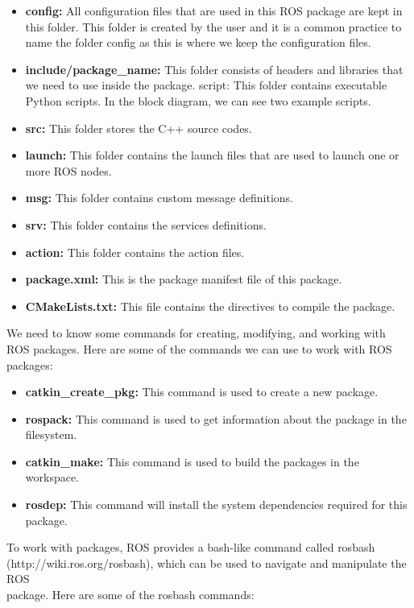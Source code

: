 \documentclass[../../main]{subfiles}
\begin{document}
\begin{itemize}
    \item \textbf{config:} All configuration files that are used in this ROS package are kept in this
    folder. This folder is created by the user and it is a common practice to name the
    folder config as this is where we keep the configuration files.
    \item \textbf{include/package\_name:} This folder consists of headers and libraries that we
    need to use inside the package.
    script: This folder contains executable Python scripts. In the block diagram, we
can see two example scripts.
\item \textbf{src:} This folder stores the C++ source codes.
\item \textbf{launch:} This folder contains the launch files that are used to launch one or more
ROS nodes.
\item \textbf{msg:} This folder contains custom message definitions.
\item \textbf{srv:} This folder contains the services definitions.
\item \textbf{action:} This folder contains the action files.
\item \textbf{package.xml:} This is the package manifest file of this package.
\item \textbf{CMakeLists.txt:} This file contains the directives to compile the package.
    
\end{itemize}
We need to know some commands for creating, modifying, and working with ROS
packages. Here are some of the commands we can use to work with ROS packages:
\begin{itemize}
\item \textbf{catkin\_create\_pkg:} This command is used to create a new package.
\item \textbf{rospack:} This command is used to get information about the package in the
filesystem.
\item \textbf{catkin\_make:} This command is used to build the packages in the workspace.
\item \textbf{rosdep:} This command will install the system dependencies required for this
package.
\end{itemize}
To work with packages, ROS provides a bash-like command called rosbash \\
(http://wiki.ros.org/rosbash), which can be used to navigate and manipulate the
ROS\\
package. Here are some of the rosbash commands:
\end{document}
